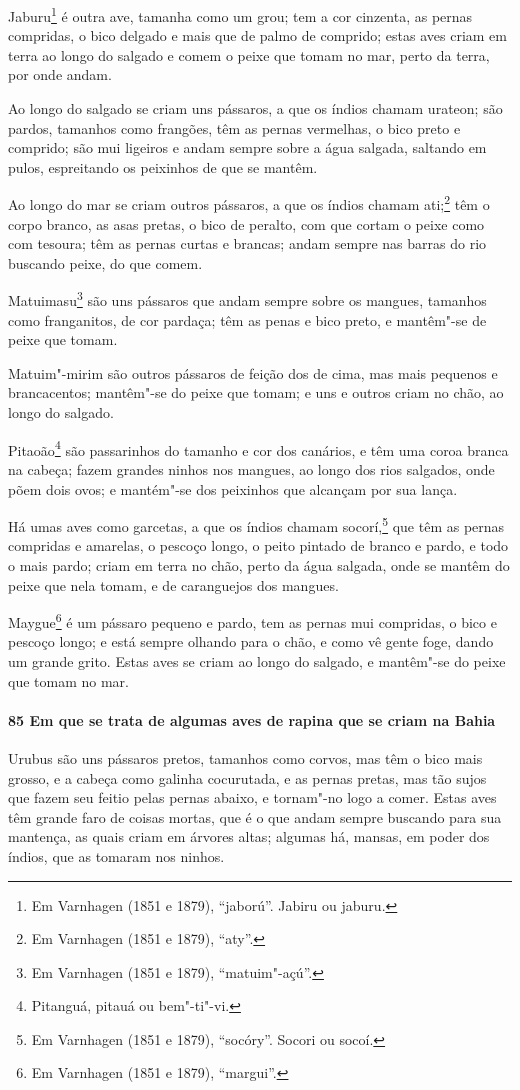 \begin{linenumbers}
Jaburu\footnote{ Em Varnhagen (1851 e 1879), ``jaború''. Jabiru ou jaburu.} é outra ave,
tamanha como um grou; tem a cor cinzenta, as pernas compridas, o bico delgado e mais que
de palmo de comprido; estas aves criam em terra ao longo do salgado e comem o peixe que
tomam no mar, perto da terra, por onde andam.

Ao longo do salgado se criam uns pássaros, a que os índios chamam urateon; são pardos,
tamanhos como frangões, têm as pernas vermelhas, o bico preto e comprido; são mui ligeiros
e andam sempre sobre a água salgada, saltando em pulos, espreitando os peixinhos de que se
mantêm.

Ao longo do mar se criam outros pássaros, a que os índios chamam ati;\footnote{ Em
Varnhagen (1851 e 1879), ``aty''.} têm o corpo branco, as asas pretas, o bico de
peralto, com que cortam o peixe como com tesoura; têm as pernas curtas e brancas; andam
sempre nas barras do rio buscando peixe, do que comem.

Matuimasu\footnote{ Em Varnhagen (1851 e 1879), ``matuim"-açú''.} são uns pássaros que
andam sempre sobre os mangues, tamanhos como franganitos, de cor pardaça; têm as penas e
bico preto, e mantêm"-se de peixe que tomam.

Matuim"-mirim são outros pássaros de feição dos de cima, mas mais pequenos e brancacentos;
mantêm"-se do peixe que tomam; e uns e outros criam no chão, ao longo do salgado.

Pitaoão\footnote{ Pitanguá, pitauá ou bem"-ti"-vi.} são passarinhos do tamanho e cor dos
canários, e têm uma coroa branca na cabeça; fazem grandes ninhos nos mangues, ao longo dos
rios salgados, onde põem dois ovos; e mantém"-se dos peixinhos que alcançam por sua lança.

Há umas aves como garcetas, a que os índios chamam socorí,\footnote{ Em Varnhagen (1851 e
1879), ``socóry''. Socori ou socoí.} que têm as pernas compridas e amarelas, o pescoço
longo, o peito pintado de branco e pardo, e todo o mais pardo; criam em terra no chão,
perto da água salgada, onde se mantêm do peixe que nela tomam, e de caranguejos dos
mangues.

Maygue\footnote{ Em Varnhagen (1851 e 1879), ``margui''.} é um pássaro pequeno e pardo,
tem as pernas mui compridas, o bico e pescoço longo; e está sempre olhando para o chão, e
como vê gente foge, dando um grande grito. Estas aves se criam ao longo do salgado, e
mantêm"-se do peixe que tomam no mar.

\paragraph{85 Em que se trata de algumas aves de rapina que se criam na Bahia}\quad
Urubus são uns pássaros pretos, tamanhos como corvos, mas têm o bico mais grosso, e a
cabeça como galinha cocurutada, e as pernas pretas, mas tão sujos que fazem seu feitio
pelas pernas abaixo, e tornam"-no logo a comer. Estas aves têm grande faro de coisas
mortas, que é o que andam sempre buscando para sua mantença, as quais criam em árvores
altas; algumas há, mansas, em poder dos índios, que as tomaram nos ninhos.


\end{linenumbers}
